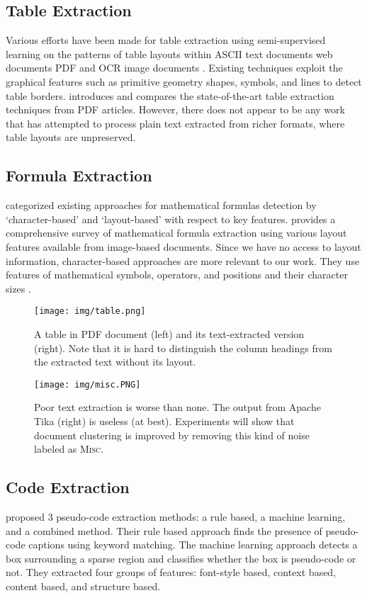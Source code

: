 \documentclass[11pt,letterpaper]{article}
\begin{document}
\subsection{Table Extraction}
Various efforts have been made for table extraction using semi-supervised learning on the patterns of table layouts within ASCII text documents \cite{ng} web documents \cite{pinto,Lerman01automaticdata,survey} PDF and OCR image documents \cite{pdffigures,tableseer}. Existing techniques exploit the graphical features such as primitive geometry shapes, symbols, and lines to detect table borders. \cite{tablesurvey} introduces and compares the state-of-the-art table extraction techniques from PDF articles. However, there does not appear to be any work that has attempted to process plain text extracted from richer formats, where table layouts are unpreserved.

\subsection{Formula Extraction}
  categorized existing approaches for mathematical formulas detection by `character-based' and `layout-based' with respect to key features.  \cite{mer} provides a comprehensive survey of mathematical formula extraction using various layout features available from image-based documents. Since we have no access to layout information, character-based approaches are more relevant to our work. They use features of mathematical symbols, operators, and positions and their character sizes \cite{suzuki,formulafuzzy}. 
 
 
\begin{figure*}[t]
\centering
\texttt{[image: img/table.png]}
\caption{A table in PDF document (left) and its text-extracted version (right). Note that it is hard to distinguish the column headings from the extracted text without its layout.}
\label{figure:table-ex}
\end{figure*}

\begin{figure*}[t]
\centering
\texttt{[image: img/misc.PNG]}
\caption{Poor text extraction is worse than none. The output from Apache Tika (right) is useless (at best). Experiments will show that document clustering is improved by removing this kind of noise labeled as \textsc{Misc.}}
\label{figure:misc-ex}
\end{figure*}
 
 
 
\subsection{Code Extraction}
 proposed 3 pseudo-code extraction methods: a rule based, a machine learning, and a combined method. Their rule based approach finds the presence of pseudo-code captions using keyword matching. The machine learning approach detects a box surrounding a sparse region and classifies whether the box is pseudo-code or not. They extracted four groups of features: font-style based, context based, content based, and structure based. 
\end{document}
